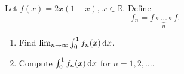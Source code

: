 \documentclass{article}
\begin{document}
	\setlength{\parindent}{0pt}
	Let $f(x)=2x(1-x),\, x\in\mathbb{R}$. Define
	$$f_n=\underbrace{f\circ\dots\circ f}_n.$$
	\begin{enumerate}[label=\alph*)]
		\item Find $\lim_{n\to\infty}\int_{0}^{1}f_n(x)\,\textup{d}x$.
		\item Compute $\int_{0}^{1}f_n(x)\,\textup{d}x$ for $n=1,2,\dots$.
	\end{enumerate}
\end{document}
